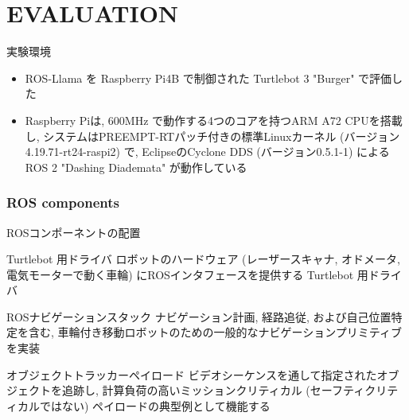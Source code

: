 
\section{EVALUATION}
\label{sec: evaluation}

\begin{frame}{実験環境}
    \begin{itemize}
        \item ROS-Llama を Raspberry Pi4B で制御された Turtlebot 3 "Burger" で評価した
        \item Raspberry Piは, $600 \mathrm{MHz}$ で動作する4つのコアを持つARM A72 CPUを搭載し, システムはPREEMPT-RTパッチ付きの標準Linuxカーネル (バージョン4.19.71-rt24-raspi2) で, EclipseのCyclone DDS (バージョン0.5.1-1) によるROS 2 "Dashing Diademata" が動作している
    \end{itemize}
\end{frame}


\subsubsection{ROS components}
\label{sssec: ros components}

\begin{frame}{ROSコンポーネントの配置}
    \begin{block}{Turtlebot 用ドライバ}
        ロボットのハードウェア (レーザースキャナ, オドメータ, 電気モーターで動く車輪) にROSインタフェースを提供する Turtlebot 用ドライバ
    \end{block}
    \begin{block}{ROSナビゲーションスタック}
        ナビゲーション計画, 経路追従, および自己位置特定を含む, 車輪付き移動ロボットのための一般的なナビゲーションプリミティブを実装
    \end{block}
    \begin{block}{オブジェクトトラッカーペイロード}
        ビデオシーケンスを通して指定されたオブジェクトを追跡し, 計算負荷の高いミッションクリティカル (セーフティクリティカルではない) ペイロードの典型例として機能する
    \end{block}
\end{frame}

